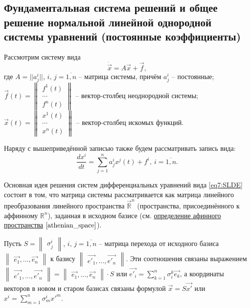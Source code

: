 \subsection{Фундаментальная система решений и общее решение нормальной линейной однородной системы уравнений (постоянные коэффициенты)}

Рассмотрим систему вида 
\begin{equation}
    \label{eq7:SLDE}
    \dot{\overrightarrow{x}} = A \overrightarrow{x} + \overrightarrow{f},
\end{equation} 
где $A = || a^i_j||$, $i,\,j = \overline{1, n}$ -- матрица системы, 
причём $a^i_j$ -- постоянные; 
$ \overrightarrow{f}(t) = 
  \begin{Vmatrix}
    f^1(t) \\
    \cdots    \\
    f^n(t)
  \end{Vmatrix}$ -- вектор-столбец неоднородной системы;
$\overrightarrow{x}(t) = 
\begin{Vmatrix}
  x^1(t) \\
  \cdots    \\
  x^n(t)
\end{Vmatrix}$ -- вектор-столбец искомых функций.  

Наряду с вышеприведённой записью также будем рассматривать запись вида: 
$$\frac{dx^i}{dt} = \sum\limits^n_{j=1}a^i_j x^j(t) + f^i, ~i = \overline{1, n}.$$

Основная идея решения систем дифференциальных уравнений вида \eqref{eq7:SLDE} 
состоит в том, что матрица системы рассматривается как матрица линейного преобразования 
линейного пространства $\overrightarrow{\mathbb{R}}^n$ (пространства, присоединённого к аффинному 
$\mathbb{R}^n$), заданная в исходном базисе (см. \hyperref[athenian_space]{определение афинного пространства} $\eqref{athenian_space}$).

Пусть $S = \begin{Vmatrix} \sigma_j^i \end{Vmatrix}$, $i,\,j = \overline{1, n}$ -- матрица перехода от исходного базиса $\begin{Vmatrix} \overrightarrow{e_1}, ..., \overrightarrow{e_n} \end{Vmatrix}$ к базису $\begin{Vmatrix} \overrightarrow{e'_1}, ..., \overrightarrow{e'_n} \end{Vmatrix}$. 
Эти соотношения связаны выражением $ \begin{Vmatrix} \overrightarrow{e'_1}, ..., \overrightarrow{e'_n} \end{Vmatrix}  = \begin{Vmatrix} \overrightarrow{e_1}, ..., \overrightarrow{e_n} \end{Vmatrix} \cdot S $ 
или $\overrightarrow{e'_i} = \sum\limits_{k = 1}^n \sigma_i^k \overrightarrow{e_k}$, а координаты векторов в новом и старом базисах связаны формулой $\overrightarrow{x} = S \overrightarrow{x'}$ или $x^i = \sum\limits_{m = 1}^n \sigma_m^i {x'}^m$.


